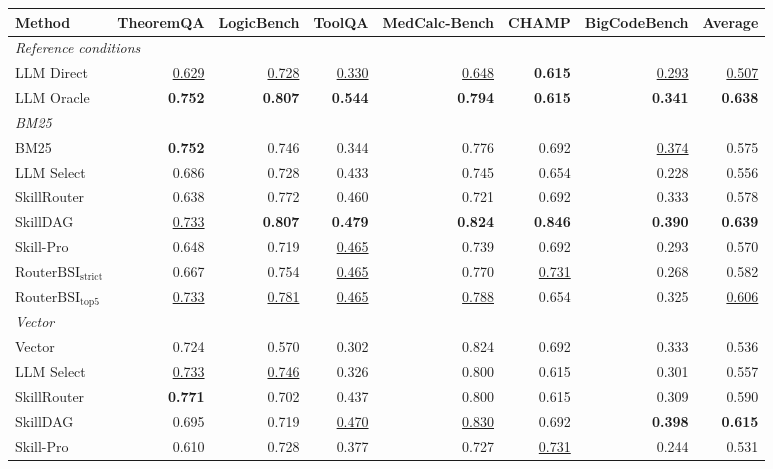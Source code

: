 \begin{table}[t]
\centering
\small
\begin{tabular*}{\textwidth}{@{\extracolsep{\fill}}lrrrrrrr@{}}
\toprule
Method & TheoremQA & LogicBench & ToolQA & MedCalc-Bench & CHAMP & BigCodeBench & Average \\
\midrule
\multicolumn{8}{l}{\textit{Reference conditions}} \\
\midrule
LLM Direct & \underline{0.629} & \underline{0.728} & \underline{0.330} & \underline{0.648} & \textbf{0.615} & \underline{0.293} & \underline{0.507} \\
LLM Oracle & \textbf{0.752} & \textbf{0.807} & \textbf{0.544} & \textbf{0.794} & \textbf{0.615} & \textbf{0.341} & \textbf{0.638} \\
\midrule
\multicolumn{8}{l}{\textit{BM25}} \\
\midrule
BM25 & \textbf{0.752} & 0.746 & 0.344 & 0.776 & 0.692 & \underline{0.374} & 0.575 \\
LLM Select & 0.686 & 0.728 & 0.433 & 0.745 & 0.654 & 0.228 & 0.556 \\
SkillRouter & 0.638 & 0.772 & 0.460 & 0.721 & 0.692 & 0.333 & 0.578 \\
SkillDAG & \underline{0.733} & \textbf{0.807} & \textbf{0.479} & \textbf{0.824} & \textbf{0.846} & \textbf{0.390} & \textbf{0.639} \\
Skill-Pro & 0.648 & 0.719 & \underline{0.465} & 0.739 & 0.692 & 0.293 & 0.570 \\
$\mathrm{RouterBSI}_{\mathrm{strict}}$ & 0.667 & 0.754 & \underline{0.465} & 0.770 & \underline{0.731} & 0.268 & 0.582 \\
$\mathrm{RouterBSI}_{\mathrm{top}5}$ & \underline{0.733} & \underline{0.781} & \underline{0.465} & \underline{0.788} & 0.654 & 0.325 & \underline{0.606} \\
\midrule
\multicolumn{8}{l}{\textit{Vector}} \\
\midrule
Vector & 0.724 & 0.570 & 0.302 & 0.824 & 0.692 & 0.333 & 0.536 \\
LLM Select & \underline{0.733} & \underline{0.746} & 0.326 & 0.800 & 0.615 & 0.301 & 0.557 \\
SkillRouter & \textbf{0.771} & 0.702 & 0.437 & 0.800 & 0.615 & 0.309 & 0.590 \\
SkillDAG & 0.695 & 0.719 & \underline{0.470} & \underline{0.830} & 0.692 & \textbf{0.398} & \textbf{0.615} \\
Skill-Pro & 0.610 & 0.728 & 0.377 & 0.727 & \underline{0.731} & 0.244 & 0.531 \\

\end{tabular*}
\end{table}
